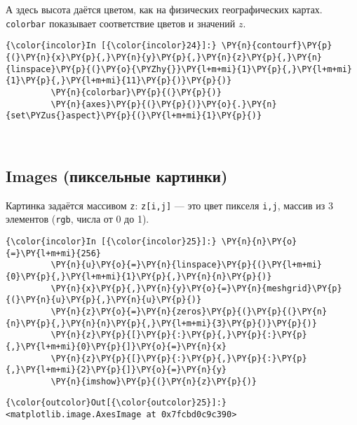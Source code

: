     А здесь высота даётся цветом, как на физических географических картах.
\texttt{colorbar} показывает соответствие цветов и значений \(z\).

    \begin{Verbatim}[commandchars=\\\{\}]
{\color{incolor}In [{\color{incolor}24}]:} \PY{n}{contourf}\PY{p}{(}\PY{n}{x}\PY{p}{,}\PY{n}{y}\PY{p}{,}\PY{n}{z}\PY{p}{,}\PY{n}{linspace}\PY{p}{(}\PY{o}{\PYZhy{}}\PY{l+m+mi}{1}\PY{p}{,}\PY{l+m+mi}{1}\PY{p}{,}\PY{l+m+mi}{11}\PY{p}{)}\PY{p}{)}
         \PY{n}{colorbar}\PY{p}{(}\PY{p}{)}
         \PY{n}{axes}\PY{p}{(}\PY{p}{)}\PY{o}{.}\PY{n}{set\PYZus{}aspect}\PY{p}{(}\PY{l+m+mi}{1}\PY{p}{)}
\end{Verbatim}

    \begin{center}
    \end{center}
    { \hspace*{\fill} \\}
    
\subsection{Images (пиксельные картинки)}
\label{matplotlib7}

Картинка задаётся массивом \texttt{z}: \texttt{z{[}i,j{]}} --- это цвет
пикселя \texttt{i,j}, массив из 3 элементов (\texttt{rgb}, числа от 0 до
1).

    \begin{Verbatim}[commandchars=\\\{\}]
{\color{incolor}In [{\color{incolor}25}]:} \PY{n}{n}\PY{o}{=}\PY{l+m+mi}{256}
         \PY{n}{u}\PY{o}{=}\PY{n}{linspace}\PY{p}{(}\PY{l+m+mi}{0}\PY{p}{,}\PY{l+m+mi}{1}\PY{p}{,}\PY{n}{n}\PY{p}{)}
         \PY{n}{x}\PY{p}{,}\PY{n}{y}\PY{o}{=}\PY{n}{meshgrid}\PY{p}{(}\PY{n}{u}\PY{p}{,}\PY{n}{u}\PY{p}{)}
         \PY{n}{z}\PY{o}{=}\PY{n}{zeros}\PY{p}{(}\PY{p}{(}\PY{n}{n}\PY{p}{,}\PY{n}{n}\PY{p}{,}\PY{l+m+mi}{3}\PY{p}{)}\PY{p}{)}
         \PY{n}{z}\PY{p}{[}\PY{p}{:}\PY{p}{,}\PY{p}{:}\PY{p}{,}\PY{l+m+mi}{0}\PY{p}{]}\PY{o}{=}\PY{n}{x}
         \PY{n}{z}\PY{p}{[}\PY{p}{:}\PY{p}{,}\PY{p}{:}\PY{p}{,}\PY{l+m+mi}{2}\PY{p}{]}\PY{o}{=}\PY{n}{y}
         \PY{n}{imshow}\PY{p}{(}\PY{n}{z}\PY{p}{)}
\end{Verbatim}

            \begin{Verbatim}[commandchars=\\\{\}]
{\color{outcolor}Out[{\color{outcolor}25}]:} <matplotlib.image.AxesImage at 0x7fcbd0c9c390>
\end{Verbatim}
        
